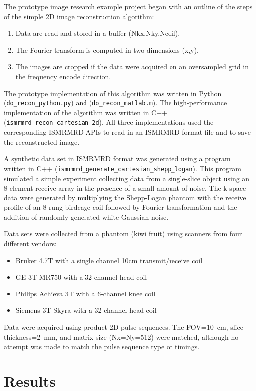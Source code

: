 \documentclass[12pt, draft]{article}
\newcommand{\mreplaced}[2][None]{\replaced[remark=#1]{#2}}
\begin{document}
The prototype image research example project began with an outline of the steps of the simple 2D image reconstruction algorithm:
\begin{enumerate}
\item Data are read and stored in a buffer (Nkx,Nky,Ncoil).
\item The Fourier transform is computed in two dimensions (x,y).
\item The images are cropped if the data were acquired on an oversampled grid in the frequency encode direction.
\end{enumerate}
The prototype implementation of this algorithm was written in Python (\texttt{do\_recon\_python.py}) and \mreplaced[R2.14]{MATLAB}{Matlab} (\texttt{do\_recon\_matlab.m}).  The high-performance implementation of the algorithm was written in C++ (\texttt{ismrmrd\_recon\_cartesian\_2d}).  All three implementations used the corresponding ISMRMRD APIs to read in an ISMRMRD format file and to save the reconstructed image.

A synthetic data set in ISMRMRD format was generated using a program written in C++ (\texttt{ismrmrd\_generate\_cartesian\_shepp\_logan}).  This program simulated a simple experiment collecting data from a single-slice object using an 8-element receive array in the presence of a small amount of noise.  The k-space data were generated by multiplying the Shepp-Logan phantom with the receive profile of an 8-rung birdcage coil followed by Fourier transformation and the addition of randomly generated white Gaussian noise.

Data sets were collected from a phantom (kiwi fruit) using scanners from four different vendors: 
\begin{itemize}
\item Bruker 4.7T with a single channel 10cm transmit/receive coil
\item GE 3T MR750 with a 32-channel head coil
\item Philips Achieva 3T with a 6-channel knee coil
\item Siemens 3T Skyra with a 32-channel head coil
\end{itemize}
Data were acquired using product 2D pulse sequences.  The FOV=10~cm, slice thickness=2~mm, and matrix size (Nx=Ny=512) were matched, although no attempt was made to match the pulse sequence type or timings.

\section*{Results}
\end{document}
